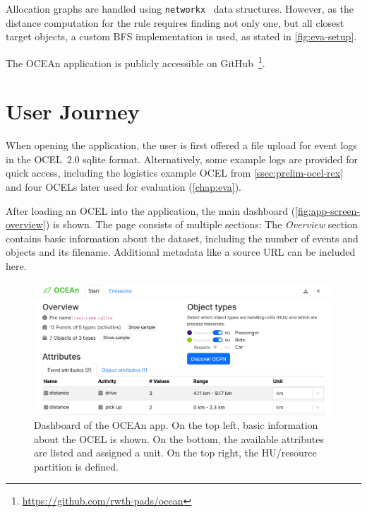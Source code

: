 Allocation graphs are handled using \texttt{networkx}~\cite{Hagberg08networkx} data structures.
However, as the distance computation for the  rule requires finding not only one, but all closest target objects, a custom BFS implementation is used, as stated in \autoref{fig:eva-setup}.

The OCEAn application is publicly accessible on GitHub~\footnote{\url{https://github.com/rwth-pads/ocean}}.

\section{User Journey}
\label{sec:impl-journey}

When opening the application, the user is first offered a file upload for event logs in the OCEL~2.0 sqlite format.
Alternatively, some example logs are provided for quick access, including the logistics example OCEL from \autoref{ssec:prelim-ocel-rex} and four OCELs later used for evaluation (\autoref{chap:eva}).

After loading an OCEL into the application, the main dashboard (\autoref{fig:app-screen-overview}) is shown. The page consists of multiple sections:
The \textit{Overview} section contains basic information about the dataset, including the number of events and objects and its filename. Additional metadata like a source URL can be included here.

\begin{figure}[t]
  \begin{small}
    \begin{center}
      \includegraphics[width=\textwidth]{figures/screenshots/20240901-ocean-overview1.png}
    \end{center}
    \caption{Dashboard of the OCEAn app. On the top left, basic information about the OCEL is shown. On the bottom, the available attributes are listed and assigned a unit. On the top right, the HU/resource partition is defined.}
    \label{fig:app-screen-overview}
  \end{small}
\end{figure}

